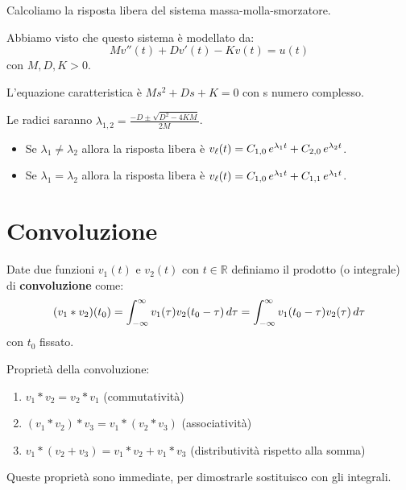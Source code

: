 	\begin{nexample}	
	Calcoliamo la risposta libera del sistema massa-molla-smorzatore.
	
	Abbiamo visto che questo sistema è modellato da:
	 \[ M v''(t) + D v'(t) - K v(t) = u(t) \]
	con $ M, D, K>0 $.
	
	L'equazione caratteristica è $ M s^2 + Ds + K=0 $ con s numero complesso.
	
	Le radici saranno $\displaystyle \lambda_{1,2} = \frac{-D\pm \sqrt{D^2 - 4KM}}{2M}$.
	\begin{itemize}
		\item Se $ \lambda_{1} \neq \lambda_{2} $ allora la risposta libera è $ v_\ell(t) = C_{1,0}\, e^{\lambda_{1}t} + C_{2,0}\, e^{\lambda_{2}t}$.
		\item Se $ \lambda_{1} = \lambda_{2} $ allora la risposta libera è $ v_\ell(t) = C_{1,0}\, e^{\lambda_{1}t} + C_{1,1}\, e^{\lambda_{1}t} $.
	\end{itemize}
	\end{nexample}



\section{Convoluzione}
	
	\begin{definizione}
		Date due funzioni $v_1(t)$ e $v_2(t) $ con $ t\in\mathbb{R} $ definiamo il prodotto (o integrale) di \textbf{convoluzione} come:
		\begin{equation*}
			(v_1 * v_2)(t_0) 
			= \int_{-\infty}^{\infty}v_1(\tau)v_2(t_0 - \tau)\, d\tau 
			= \int_{-\infty}^{\infty}v_1(t_0 - \tau)v_2(\tau )\, d\tau
		\end{equation*}
		con $t_0 $ fissato.
	\end{definizione}
		
	Proprietà della convoluzione:
		\begin{enumerate}
			\item $v_1 * v_2 = v_2 * v_1 $ (commutatività)
			\item $(v_1 * v_2) * v_3  = v_1 * (v_2 * v_3) $ (associatività)
			\item $v_1 * (v_2 + v_3)  = v_1 * v_2 + v_1 * v_3$ (distributività rispetto alla somma)
		\end{enumerate}
		Queste proprietà sono immediate, per dimostrarle sostituisco con gli integrali.
	

